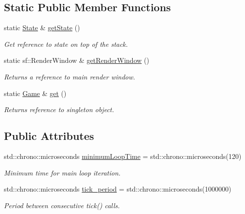 \subsection*{Static Public Member Functions}
\begin{DoxyCompactItemize}
\item 
\hypertarget{classGame_aa742f626e4b8a5dac8677ef40263716c}{static \hyperlink{classState}{State} \& \hyperlink{classGame_aa742f626e4b8a5dac8677ef40263716c}{get\-State} ()}\label{classGame_aa742f626e4b8a5dac8677ef40263716c}

\begin{DoxyCompactList}\small\item\em Get reference to state on top of the stack. \end{DoxyCompactList}\item 
\hypertarget{classGame_ada9faa2a1f4e1453420adead02fd9865}{static sf\-::\-Render\-Window \& \hyperlink{classGame_ada9faa2a1f4e1453420adead02fd9865}{get\-Render\-Window} ()}\label{classGame_ada9faa2a1f4e1453420adead02fd9865}

\begin{DoxyCompactList}\small\item\em Returns a reference to main render window. \end{DoxyCompactList}\item 
\hypertarget{classGame_ac69a0c5e25c7acb811f4a7b86a2ceb74}{static \hyperlink{classGame}{Game} \& \hyperlink{classGame_ac69a0c5e25c7acb811f4a7b86a2ceb74}{get} ()}\label{classGame_ac69a0c5e25c7acb811f4a7b86a2ceb74}

\begin{DoxyCompactList}\small\item\em Returns reference to singleton object. \end{DoxyCompactList}\end{DoxyCompactItemize}
\subsection*{Public Attributes}
\begin{DoxyCompactItemize}
\item 
std\-::chrono\-::microseconds \hyperlink{classGame_af9f24863bbe8102d1bf5d97aaa449d14}{minimum\-Loop\-Time} = std\-::chrono\-::microseconds(120)
\begin{DoxyCompactList}\small\item\em Minimum time for main loop iteration. \end{DoxyCompactList}\item 
std\-::chrono\-::microseconds \hyperlink{classGame_a65800b8c8afee406d719b404a4a78877}{tick\-\_\-period} = std\-::chrono\-::microseconds(1000000)
\begin{DoxyCompactList}\small\item\em Period between consecutive tick() calls. \end{DoxyCompactList}\end{DoxyCompactItemize}
